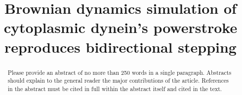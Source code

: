 \documentclass[9pt,twocolumn,twoside]{article}
\title{Brownian dynamics simulation of cytoplasmic dynein's powerstroke reproduces bidirectional stepping}
\begin{document}
\maketitle

\begin{abstract}
  Please provide an abstract of no more than 250 words in a single paragraph. Abstracts should explain to the general reader the major contributions of the article. References in the abstract must be cited in full within the abstract itself and cited in the text.
\end{abstract}

\end{document}
